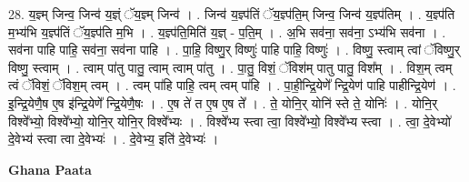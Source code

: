 \documentclass[17pt]{extarticle}
\begin{document}
28. य॒ज्ञ्म् जिन्व॒ जिन्व॑ य॒ज्ञ्ं ॅय॒ज्ञ्म् जिन्व॑ । . जिन्व॑ य॒ज्ञ्प॑तिं ॅय॒ज्ञ्प॑ति॒म् जिन्व॒ जिन्व॑ य॒ज्ञ्प॑तिम् । . य॒ज्ञ्प॑ति म॒भ्य॑भि य॒ज्ञ्प॑तिं ॅय॒ज्ञ्प॑ति म॒भि । . य॒ज्ञ्प॑ति॒मिति॑ य॒ज्ञ् - प॒ति॒म् । . अ॒भि सव॑ना॒ सव॑ना॒ ऽभ्य॑भि सव॑ना । . सव॑ना पाहि पाहि॒ सव॑ना॒ सव॑ना पाहि । . पा॒हि॒ विष्णु॒र् विष्णुः॑ पाहि पाहि॒ विष्णुः॑ । . विष्णु॒ स्त्वाम् त्वां ॅविष्णु॒र् विष्णु॒ स्त्वाम् । . त्वाम् पा॑तु पातु॒ त्वाम् त्वाम् पा॑तु । . पा॒तु॒ विशं॒ ॅविश॑म् पातु पातु॒ विश᳚म् । . विश॒म् त्वम् त्वं ॅविशं॒ ॅविश॒म् त्वम् । . त्वम् पा॑हि पाहि॒ त्वम् त्वम् पा॑हि । . पा॒ही॒न्द्रि॒येणे᳚ न्द्रि॒येण॑ पाहि पाहीन्द्रि॒येण॑ । . इ॒न्द्रि॒येणै॒ष ए॒ष इ॑न्द्रि॒येणे᳚ न्द्रि॒येणै॒षः । . ए॒ष ते॑ त ए॒ष ए॒ष ते᳚ । . ते॒ योनि॒र् योनि॑ स्ते ते॒ योनिः॑ । . योनि॒र् विश्वे᳚भ्यो॒ विश्वे᳚भ्यो॒ योनि॒र् योनि॒र् विश्वे᳚भ्यः । . विश्वे᳚भ्य स्त्वा त्वा॒ विश्वे᳚भ्यो॒ विश्वे᳚भ्य स्त्वा । . त्वा॒ दे॒वेभ्यो॑ दे॒वेभ्य॑ स्त्वा त्वा दे॒वेभ्यः॑ । . दे॒वेभ्य॒ इति॑ दे॒वेभ्यः॑ । \newline

\textbf{Ghana Paata } \newline
\end{document}

